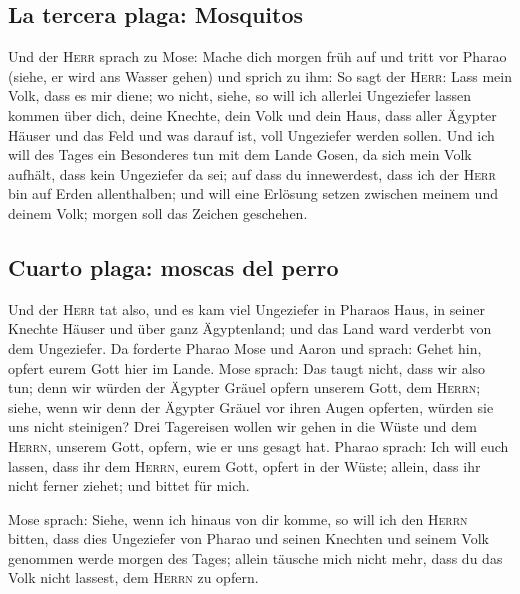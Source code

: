 \hypertarget{la-tercera-plaga-mosquitos}{%
\subsection{La tercera plaga:
Mosquitos}\label{la-tercera-plaga-mosquitos}}

 Und der \textsc{Herr} sprach zu Mose: Mache dich morgen
früh auf und tritt vor Pharao (siehe, er wird ans Wasser gehen) und
sprich zu ihm: So sagt der \textsc{Herr}: Lass mein Volk, dass es mir
diene;  wo nicht, siehe, so will ich allerlei Ungeziefer
lassen kommen über dich, deine Knechte, dein Volk und dein Haus, dass
aller Ägypter Häuser und das Feld und was darauf ist, voll Ungeziefer
werden sollen.  Und ich will des Tages ein Besonderes tun
mit dem Lande Gosen, da sich mein Volk aufhält, dass kein Ungeziefer da
sei; auf dass du innewerdest, dass ich der \textsc{Herr} bin auf Erden
allenthalben;  und will eine Erlösung setzen zwischen
meinem und deinem Volk; morgen soll das Zeichen geschehen.

\hypertarget{cuarto-plaga-moscas-del-perro}{%
\subsection{Cuarto plaga: moscas del
perro}\label{cuarto-plaga-moscas-del-perro}}

 Und der \textsc{Herr} tat also, und es kam viel
Ungeziefer in Pharaos Haus, in seiner Knechte Häuser und über ganz
Ägyptenland; und das Land ward verderbt von dem Ungeziefer.
 Da forderte Pharao Mose und Aaron und sprach: Gehet hin,
opfert eurem Gott hier im Lande.  Mose sprach: Das taugt
nicht, dass wir also tun; denn wir würden der Ägypter Gräuel opfern
unserem Gott, dem \textsc{Herrn}; siehe, wenn wir denn der Ägypter
Gräuel vor ihren Augen opferten, würden sie uns nicht steinigen?
 Drei Tagereisen wollen wir gehen in die Wüste und dem
\textsc{Herrn}, unserem Gott, opfern, wie er uns gesagt hat.
 Pharao sprach: Ich will euch lassen, dass ihr dem
\textsc{Herrn}, eurem Gott, opfert in der Wüste; allein, dass ihr nicht
ferner ziehet; und bittet für mich.

 Mose sprach: Siehe, wenn ich hinaus von dir komme, so
will ich den \textsc{Herrn} bitten, dass dies Ungeziefer von Pharao und
seinen Knechten und seinem Volk genommen werde morgen des Tages; allein
täusche mich nicht mehr, dass du das Volk nicht lassest, dem
\textsc{Herrn} zu opfern.

